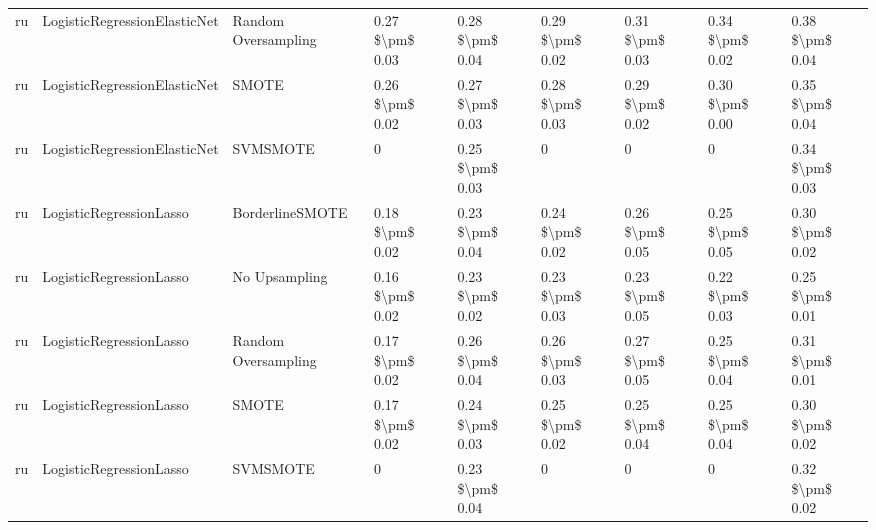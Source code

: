 \begin{tabular}{lllllllll}
      ru &    LogisticRegressionElasticNet &           Random Oversampling &     0.27 \$\textbackslash pm\$ 0.03 &           0.28 \$\textbackslash pm\$ 0.04 &       0.29 \$\textbackslash pm\$ 0.02 &        0.31 \$\textbackslash pm\$ 0.03 &                         0.34 \$\textbackslash pm\$ 0.02 &     0.38 \$\textbackslash pm\$ 0.04 \\
      ru &    LogisticRegressionElasticNet &                         SMOTE &     0.26 \$\textbackslash pm\$ 0.02 &           0.27 \$\textbackslash pm\$ 0.03 &       0.28 \$\textbackslash pm\$ 0.03 &        0.29 \$\textbackslash pm\$ 0.02 &                         0.30 \$\textbackslash pm\$ 0.00 &     0.35 \$\textbackslash pm\$ 0.04 \\
      ru &    LogisticRegressionElasticNet &                      SVMSMOTE &                   0 &           0.25 \$\textbackslash pm\$ 0.03 &                     0 &                      0 &                                       0 &     0.34 \$\textbackslash pm\$ 0.03 \\
      ru &         LogisticRegressionLasso &               BorderlineSMOTE &     0.18 \$\textbackslash pm\$ 0.02 &           0.23 \$\textbackslash pm\$ 0.04 &       0.24 \$\textbackslash pm\$ 0.02 &        0.26 \$\textbackslash pm\$ 0.05 &                         0.25 \$\textbackslash pm\$ 0.05 &     0.30 \$\textbackslash pm\$ 0.02 \\
      ru &         LogisticRegressionLasso &                 No Upsampling &     0.16 \$\textbackslash pm\$ 0.02 &           0.23 \$\textbackslash pm\$ 0.02 &       0.23 \$\textbackslash pm\$ 0.03 &        0.23 \$\textbackslash pm\$ 0.05 &                         0.22 \$\textbackslash pm\$ 0.03 &     0.25 \$\textbackslash pm\$ 0.01 \\
      ru &         LogisticRegressionLasso &           Random Oversampling &     0.17 \$\textbackslash pm\$ 0.02 &           0.26 \$\textbackslash pm\$ 0.04 &       0.26 \$\textbackslash pm\$ 0.03 &        0.27 \$\textbackslash pm\$ 0.05 &                         0.25 \$\textbackslash pm\$ 0.04 &     0.31 \$\textbackslash pm\$ 0.01 \\
      ru &         LogisticRegressionLasso &                         SMOTE &     0.17 \$\textbackslash pm\$ 0.02 &           0.24 \$\textbackslash pm\$ 0.03 &       0.25 \$\textbackslash pm\$ 0.02 &        0.25 \$\textbackslash pm\$ 0.04 &                         0.25 \$\textbackslash pm\$ 0.04 &     0.30 \$\textbackslash pm\$ 0.02 \\
      ru &         LogisticRegressionLasso &                      SVMSMOTE &                   0 &           0.23 \$\textbackslash pm\$ 0.04 &                     0 &                      0 &                                       0 &     0.32 \$\textbackslash pm\$ 0.02 \\

\end{tabular}

